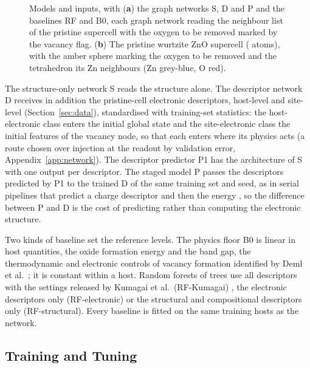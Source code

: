 \begin{figure}[H]
\centering
{}
\caption{Models and inputs, with (\textbf{a}) the graph networks S, D and P and the baselines RF and B0, each graph network reading the neighbour list of the pristine supercell with the oxygen to be removed marked by the vacancy flag. (\textbf{b}) The pristine wurtzite ZnO supercell (\numStructureAuditZnoCifNAtoms{} atoms), with the amber sphere marking the oxygen to be removed and the tetrahedron its Zn neighbours (Zn grey-blue, O red).\label{fig:models}}
\end{figure}

The structure-only network S reads the structure alone. The descriptor network D receives in addition the \numRfElectronicNFeatures{} pristine-cell electronic descriptors, \numNetDescriptorsHost{} host-level and \numNetDescriptorsSite{} site-level (Section~\ref{sec:data}), standardised with training-set statistics: the host-electronic class enters the initial global state and the site-electronic class the initial features of the vacancy node, so that each enters where its physics acts (a route chosen over injection at the readout by validation error, Appendix~\ref{app:network}). The descriptor predictor P1 has the architecture of S with one output per descriptor. The staged model P passes the descriptors predicted by P1 to the trained D of the same training set and seed, as in serial pipelines that predict a charge descriptor and then the energy \citep{Linton2026framework}, so the difference between P and D is the cost of predicting rather than computing the electronic structure.

Two kinds of baseline set the reference levels. The physics floor B0 is linear in \numCfgModelsPhysicsFloorNParameters{} host quantities, the oxide formation energy and the band gap, the thermodynamic and electronic controls of vacancy formation identified by Deml et al.\ \citep{Deml2014oxide,Deml2015intrinsic}; it is constant within a host. Random forests \citep{Breiman2001random,Pedregosa2018scikitlearn} of \numRfKumagaiHyperparametersNEstimators{} trees use all \numRfKumagaiNFeatures{} descriptors with the settings released by Kumagai et al.\ (RF-Kumagai) \citep{Kumagai2021insights}, the electronic descriptors only (RF-electronic) or the structural and compositional descriptors only (RF-structural). Every baseline is fitted on the same training hosts as the network.

\subsection{Training and Tuning}
\label{sec:training}

